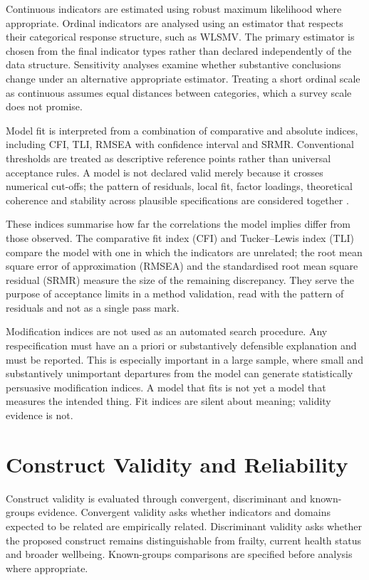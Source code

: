 Continuous indicators are estimated using robust maximum likelihood where appropriate. Ordinal indicators are analysed using an estimator that respects their categorical response structure, such as WLSMV. The primary estimator is chosen from the final indicator types rather than declared independently of the data structure. Sensitivity analyses examine whether substantive conclusions change under an alternative appropriate estimator. Treating a short ordinal scale as continuous assumes equal distances between categories, which a survey scale does not promise.

Model fit is interpreted from a combination of comparative and absolute indices, including CFI, TLI, RMSEA with confidence interval and SRMR. Conventional thresholds are treated as descriptive reference points rather than universal acceptance rules. A model is not declared valid merely because it crosses numerical cut-offs; the pattern of residuals, local fit, factor loadings, theoretical coherence and stability across plausible specifications are considered together \citep{hu_bentler_1999,kline_2015,brown_2015}.

These indices summarise how far the correlations the model implies differ from those observed. The comparative fit index (CFI) and Tucker--Lewis index (TLI) compare the model with one in which the indicators are unrelated; the root mean square error of approximation (RMSEA) and the standardised root mean square residual (SRMR) measure the size of the remaining discrepancy. They serve the purpose of acceptance limits in a method validation, read with the pattern of residuals and not as a single pass mark.

Modification indices are not used as an automated search procedure. Any respecification must have an a priori or substantively defensible explanation and must be reported. This is especially important in a large sample, where small and substantively unimportant departures from the model can generate statistically persuasive modification indices.
A model that fits is not yet a model that measures the intended thing. Fit indices are silent about meaning; validity evidence is not.

\section{Construct Validity and Reliability}
\label{sec:validity}

Construct validity is evaluated through convergent, discriminant and known-groups evidence. Convergent validity asks whether indicators and domains expected to be related are empirically related. Discriminant validity asks whether the proposed construct remains distinguishable from frailty, current health status and broader wellbeing. Known-groups comparisons are specified before analysis where appropriate.

